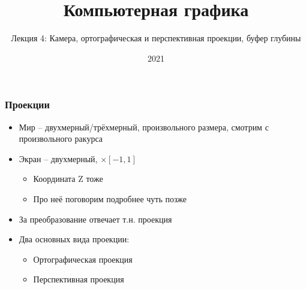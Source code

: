 \documentclass{beamer}
\title{Компьютерная графика}
\subtitle{Лекция 4: Камера, ортографическая и перспективная проекции, буфер глубины}
\date{2021}
\begin{document}
\frame{\titlepage}

\begin{frame}[fragile]
\frametitle{Проекции}
\begin{itemize}
\item Мир -- двухмерный/трёхмерный, произвольного размера, смотрим с произвольного ракурса
\pause
\item Экран -- двухмерный, \begin{math}[-1, 1] \times [-1, 1]\end{math}
\pause
\begin{itemize}
\item Координата Z тоже \begin{math}[-1, 1]\end{math}
\item Про неё поговорим подробнее чуть позже
\end{itemize}
\pause
\item За преобразование отвечает т.н. проекция
\pause
\item Два основных вида проекции:
\begin{itemize}
\item Ортографическая проекция
\item Перспективная проекция
\end{itemize}
\end{itemize}
\end{frame}
\end{document}
